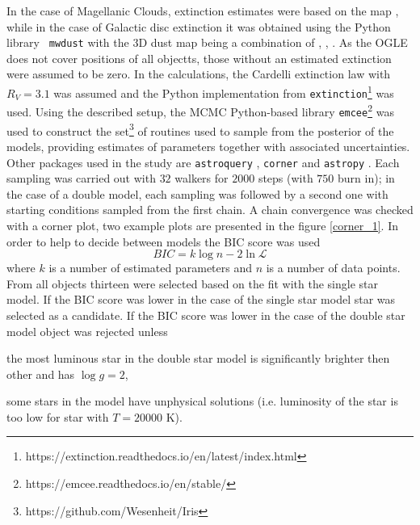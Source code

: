 \documentclass{pracalicmgr}
\newenvironment{itemize*}%
  {\vspace{-\topsep}
    \begin{itemize}%
    \setlength{\itemsep}{0pt}%
    \setlength{\parskip}{0pt}}%
  {\end{itemize}
  \vspace{-\topsep}}
\begin{document}
In the case of Magellanic Clouds, extinction estimates were based on the map \citet{skowron_ogle-ing_2021}, while in the case of Galactic disc extinction it
was obtained using the Python library \texttt{ mwdust} \citep{bovy_galactic_2016} with the 3D dust map being a combination of \citet{green_3d_2019}, \citet{greiner_unusually_2001},
\citet{drimmel_three-dimensional_2003}.
As the OGLE does not cover positions of all objectts, those without an estimated extinction were assumed to be zero.
In the calculations, the Cardelli extinction law \citep{cardelli_relationship_1989} with $R_V=3.1$ was assumed
and the Python implementation from \texttt{extinction}\footnote{https://extinction.readthedocs.io/en/latest/index.html} was used.
Using the described setup, the MCMC Python-based library \texttt{emcee}\footnote{https://emcee.readthedocs.io/en/stable/} \citep{foreman-mackey_emcee_2013}
was used to construct the set\footnote{https://github.com/Wesenheit/Iris} of routines used to sample from the posterior of the models, providing estimates of parameters together
with associated uncertainties.
Other packages used in the study are \texttt{astroquery} \citep{ginsburg_astroquery_2019},
\texttt{corner} \citep{foreman-mackey_cornerpy_2016} and \texttt{astropy} \citep{astropy_collaboration_astropy_2022}.
Each sampling was carried out with $32$ walkers for $2000$ steps (with $750$ burn in); in the case of a double model, each sampling 
was followed by a second one with starting conditions sampled from the first chain. 
A chain convergence was checked with a corner plot, two example plots are presented in the figure
\ref{corner_1}.
In order to help to decide between models
the BIC score was used 
\begin{equation}
    BIC=k\log{n}-2\ln{\mathcal{L}}
\end{equation} where $k$ is a number of estimated parameters and $n$ is a number of data points. From all objects thirteen were selected based on the
fit with the single star model.
If the BIC score was lower in the case of the single star model star was selected as a candidate.
If the BIC score was lower in the case of the double star model object was rejected unless
\begin{itemize*}
    \item the most luminous star in the double star model is significantly brighter then other and has $\log g=2$,
    \item some stars in the model have unphysical solutions (i.e. luminosity of the star is too low for star with $T=20000$ K).
\end{itemize*}
\end{document}
